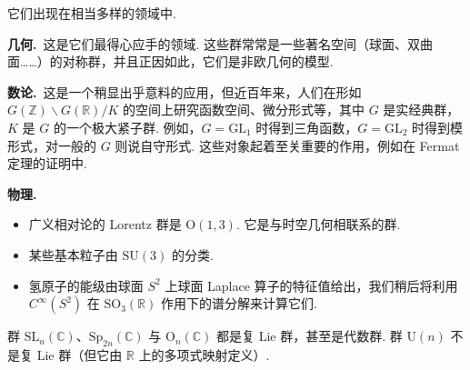 \begin{numpara}[经典群的重要性]\label{np:ssl-1-2-12}
它们出现在相当多样的领域中.

\textbf{几何.}\ 这是它们最得心应手的领域. 这些群常常是一些著名空间（球面、双曲面……）的对称群，并且正因如此，它们是非欧几何的模型.

\textbf{数论.}\ 这是一个稍显出乎意料的应用，但近百年来，人们在形如 $G(\mathbb{Z})\backslash G(\mathbb{R})/K$ 的空间上研究函数空间、微分形式等，其中 $G$ 是实经典群，$K$ 是 $G$ 的一个极大紧子群. 例如，$G=\mathrm{GL}_1$ 时得到三角函数，$G=\mathrm{GL}_2$ 时得到模形式，对一般的 $G$ 则说自守形式. 这些对象起着至关重要的作用，例如在 Fermat 定理的证明中.

\textbf{物理.}
\begin{itemize}
\item 广义相对论的 Lorentz 群是 $\mathrm{O}(1,3)$. 它是与时空几何相联系的群.
\item 某些基本粒子由 $\mathrm{SU}(3)$ 的分类.
\item 氢原子的能级由球面 $S^{2}$ 上球面 Laplace 算子的特征值给出，我们稍后将利用 $C^{\infty}(S^{2})$ 在 $\mathrm{SO}_3(\mathbb{R})$ 作用下的谱分解来计算它们.
\end{itemize}

\begin{remark*}
群 $\mathrm{SL}_n(\mathbb{C})$、$\mathrm{Sp}_{2n}(\mathbb{C})$ 与 $\mathrm{O}_n(\mathbb{C})$ 都是复 Lie 群，甚至是代数群. 群 $\mathrm{U}(n)$ 不是复 Lie 群（但它由 $\mathbb{R}$ 上的多项式映射定义）.
\end{remark*}
\end{numpara}
